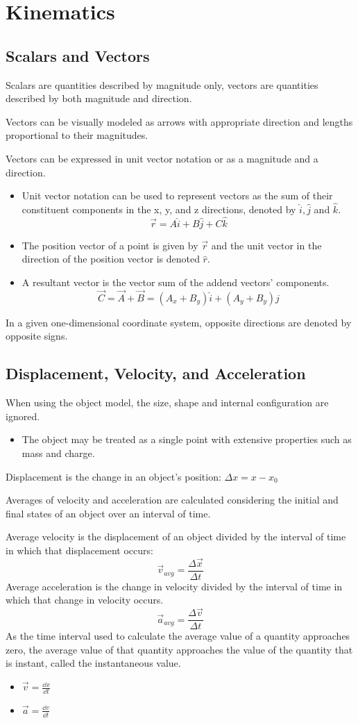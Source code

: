 \documentclass[../mech.tex]{subfiles}
\begin{document}
\chapter{Kinematics}
\section{Scalars and Vectors}
Scalars are quantities described by magnitude only, vectors are quantities described by both magnitude and direction.

Vectors can be visually modeled as arrows with appropriate direction and lengths proportional to their magnitudes.

Vectors can be expressed in unit vector notation or as a magnitude and a direction.
\begin{itemize}
    \item Unit vector notation can be used to represent vectors as the sum of their constituent components in the x, y, and z directions, denoted by $\hat{i}, \hat{j}$ and $\hat{k}$.
    \[ \vec{r} = A\hat{i}+B\hat{j}+C\hat{k}\]
    \item The position vector of a point is given by $\vec{r}$ and the unit vector in the direction of the position vector is denoted $\hat{r}$.
    \item A resultant vector is the vector sum of the addend vectors' components. 
    \[ \vec{C}=\vec{A}+\vec{B}=(A_x+B_y)\hat{i}+(A_y+B_y)\hat{j} \]
\end{itemize}

In a given one-dimensional coordinate system, opposite directions are denoted by opposite signs.
\section{Displacement, Velocity, and Acceleration}
When using the object model, the size, shape and internal configuration are ignored.
\begin{itemize}
    \item The object may be treated as a single point with extensive properties such as mass and charge.
\end{itemize}
Displacement is the change in an object's position: $\Delta x = x-x_0$

Averages of velocity and acceleration are calculated considering the initial and final states of an object over an interval of time.

Average velocity is the displacement of an object divided by the interval of time in which that displacement occurs:
\[ \vec{v}_{avg}=\frac{\Delta \vec{x}}{\Delta t}\]
Average acceleration is the change in velocity divided by the interval of time in which that change in velocity occurs.
\[ \vec{a}_{avg}=\frac{\Delta \vec{v}}{\Delta t}\]
As the time interval used to calculate the average value of a quantity approaches zero, the average value of that quantity approaches the value of the quantity that is instant, called the instantaneous value.
\begin{itemize}
    \item $\vec{v} = \frac{\dd x}{\dd t}$
    \item $\vec{a} = \frac{\dd v}{\dd t}$
\end{itemize}
\end{document}
